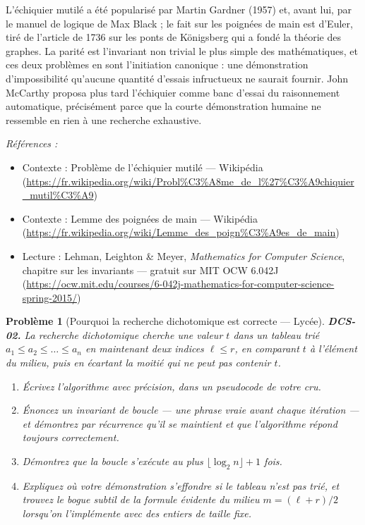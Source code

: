 \documentclass[11pt]{article}
\newtheorem{problem}{Problème}
\newenvironment{refs}{\par\small\noindent\emph{Références :}\begin{itemize}\setlength\itemsep{0pt}}{\end{itemize}\normalsize}
\begin{document}
\noindent L'échiquier mutilé a été popularisé par Martin Gardner (1957) et, avant lui, par le manuel de logique de Max Black ; le fait sur les poignées de main est d'Euler, tiré de l'article de 1736 sur les ponts de Königsberg qui a fondé la théorie des graphes. La parité est l'invariant non trivial le plus simple des mathématiques, et ces deux problèmes en sont l'initiation canonique : une démonstration d'impossibilité qu'aucune quantité d'essais infructueux ne saurait fournir. John McCarthy proposa plus tard l'échiquier comme banc d'essai du raisonnement automatique, précisément parce que la courte démonstration humaine ne ressemble en rien à une recherche exhaustive.

\begin{refs}
\item Contexte : Problème de l'échiquier mutilé --- Wikipédia (\url{https://fr.wikipedia.org/wiki/Probl%C3%A8me_de_l%27%C3%A9chiquier_mutil%C3%A9})
\item Contexte : Lemme des poignées de main --- Wikipédia (\url{https://fr.wikipedia.org/wiki/Lemme_des_poign%C3%A9es_de_main})
\item Lecture : Lehman, Leighton \& Meyer, \textit{Mathematics for Computer Science}, chapitre sur les invariants --- gratuit sur MIT OCW 6.042J (\url{https://ocw.mit.edu/courses/6-042j-mathematics-for-computer-science-spring-2015/})
\end{refs}

\bigskip

\begin{problem}[{Pourquoi la recherche dichotomique est correcte --- Lycée}]
\textbf{DCS-02.} La recherche dichotomique cherche une valeur $t$ dans un tableau trié $a_1 \le a_2 \le \dots \le a_n$ en maintenant deux indices $\ell \le r$, en comparant $t$ à l'élément du milieu, puis en écartant la moitié qui ne peut pas contenir $t$.
\begin{enumerate}
\item[(a)] Écrivez l'algorithme avec précision, dans un pseudocode de votre cru.
\item[(b)] Énoncez un invariant de boucle --- une phrase vraie avant chaque itération --- et démontrez par récurrence qu'il se maintient et que l'algorithme répond toujours correctement.
\item[(c)] Démontrez que la boucle s'exécute au plus $\lfloor \log_2 n \rfloor + 1$ fois.
\item[(d)] Expliquez où votre démonstration s'effondre si le tableau n'est pas trié, et trouvez le bogue subtil de la formule \og{} évidente \fg{} du milieu $m = (\ell + r)/2$ lorsqu'on l'implémente avec des entiers de taille fixe.
\end{enumerate}

\end{problem}
\end{document}
